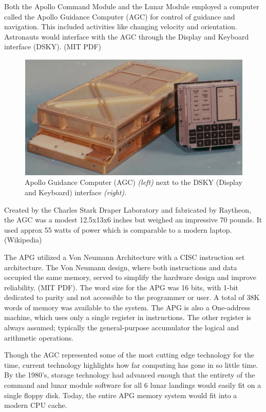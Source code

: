 \documentclass[a4paper,11pt]{article}
\begin{document}
Both the Apollo Command Module and the Lunar Module employed a computer called the Apollo Guidance Computer (AGC) for control of guidance and navigation.  This included activities like changing velocity and orientation.  Astronauts would interface with the AGC through the Display and Keyboard interface (DSKY).  (MIT PDF)

\begin{figure}[h!]
\caption{Apollo Guidance Computer (AGC) {\it (left)} next to the DSKY (Display and Keyboard) interface {\it (right)}.} 
\centering
\includegraphics[width=.8\textwidth]{Agc_view.jpg} 
\end{figure}
\vspace{0.02cm}

Created by the Charles Stark Draper Laboratory and fabricated by Raytheon, the AGC was a modest 12.5x13x6 inches but weighed an impressive 70 pounds.  It used approx 55 watts of power which is comparable to a modern laptop.  (Wikipedia)

The APG utilized a Von Neumann Architecture with a CISC instruction set architecture.  The Von Neumann design, where both instructions and data occupied the same memory, served to simplify the hardware design and improve reliability. (MIT PDF).  The word size for the APG was 16 bits, with 1-bit dedicated to parity and not accessible to the programmer or user.  A total of 38K words of memory was available to the system.  The APG is also a One-address machine, which uses only a single register in instructions.  The other register is always assumed; typically the general-purpose accumulator the logical and arithmetic operations.  

Though the AGC represented some of the most cutting edge technology for the time, current technology highlights how far computing has gone in so little time.  By the 1980's, storage technology had advanced enough that the entirety of the command and lunar module software for all 6 lunar landings would easily fit on a single floppy disk.  Today, the entire APG memory system would fit into a modern CPU cache.
\end{document}
